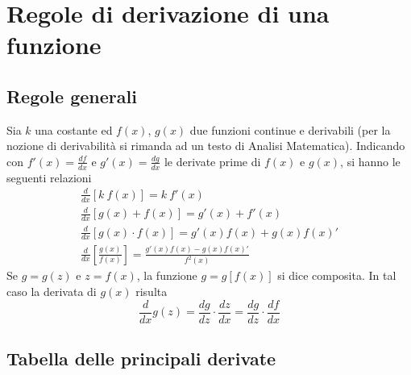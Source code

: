 \documentclass[10pt,a4paper]{book}
\begin{document}
\section{Regole di derivazione di una funzione}

\subsection*{Regole generali}

Sia $\displaystyle k$ una costante ed $\displaystyle f( x)$, $\displaystyle g( x)$ due funzioni continue e derivabili (per la nozione di derivabilità si rimanda ad un testo di Analisi Matematica). Indicando con $\displaystyle f'( x) =\frac{df}{dx}$ e $\displaystyle g'( x) =\frac{dg}{dx}$ le derivate prime di $\displaystyle f( x)$ e $\displaystyle g( x)$, si hanno le seguenti relazioni
\begin{equation*}
	\begin{array}{ c }
		\frac{d}{dx}[ k\ f( x)] =k\ f'( x)\\
		[4mm]
		\frac{d}{dx}[ g( x) +f( x)] =g'( x) +f'( x)\\
		[4mm]
		\frac{d}{dx}[ g( x) \cdot f( x)] =g'( x) f( x) +g( x) f( x) '\\
		[4mm]
		\frac{d}{dx}\left[\frac{g( x)}{f( x)}\right] =\frac{g'( x) f( x) -g( x) f( x) '}{f^2( x)}
	\end{array}
\end{equation*}
Se $\displaystyle g=g( z)$ e $\displaystyle z=f( x)$, la funzione $\displaystyle g=g[ f( x)]$ si dice composita. In tal caso la derivata di $\displaystyle g( x)$ risulta
\begin{equation*}
	\frac{d}{dx} g( z) =\frac{dg}{dz} \cdot \frac{dz}{dx} =\frac{dg}{dz} \cdot \frac{df}{dx}
\end{equation*}



\subsection*{Tabella delle principali derivate}
\end{document}
